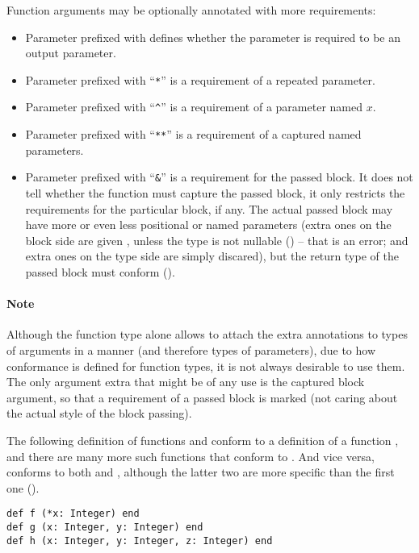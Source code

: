 Function arguments may be optionally annotated with more requirements: 
\begin{itemize}
\item
Parameter prefixed with  defines whether the parameter is required to be an output parameter. 

\item
Parameter prefixed with ``\lstinline!*!'' is a requirement of a repeated parameter. 

\item 
Parameter prefixed with ``\lstinline!^!'' is a requirement of a parameter named $x$.

\item 
Parameter prefixed with ``\lstinline!**!'' is a requirement of a captured named parameters. 

\item
Parameter prefixed with ``\lstinline!&!'' is a requirement for the passed block. It does not tell whether the function must capture the passed block, it only restricts the requirements for the particular block, if any. The actual passed block may have more or even less positional or named parameters (extra ones on the block side are given , unless the type is not nullable () -- that is an error; and extra ones on the type side are simply discared), but the return type of the passed block must conform ().
\end{itemize}

\paragraph{Note}
Although the function type alone allows to attach the extra annotations to types of arguments in a  manner (and therefore types of parameters), due to how conformance is defined for function types, it is not always desirable to use them. The only argument extra that might be of any use is the captured block argument, so that a requirement of a passed block is marked (not caring about the actual style of the block passing). 

\example The following definition of functions  and  conform to a definition of a function , and there are many more such functions that conform to . And vice versa,  conforms to both  and , although the latter two are more specific than the first one (). 
\begin{lstlisting}
def f (*x: Integer) end
def g (x: Integer, y: Integer) end
def h (x: Integer, y: Integer, z: Integer) end
\end{lstlisting}






